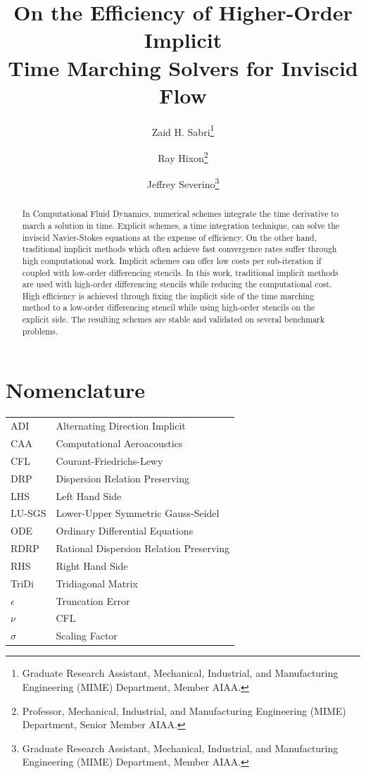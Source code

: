 \documentclass[conf]{new-aiaa}
\title{On the Efficiency of Higher-Order Implicit \\ Time Marching Solvers for Inviscid Flow
}
\author{Zaid H. Sabri\footnote{Graduate Research Assistant, Mechanical, Industrial, and Manufacturing Engineering (MIME) Department, Member AIAA.}}
\author{Ray Hixon\footnote{Professor, Mechanical, Industrial, and Manufacturing Engineering (MIME) Department, Senior Member AIAA.}}
\author{Jeffrey Severino\footnote{Graduate Research Assistant, Mechanical, Industrial, and Manufacturing Engineering (MIME) Department, Member AIAA.}}
\affil{University of Toledo, Toledo, OH, 43606}
\begin{document}
\maketitle

\begin{abstract}

In Computational Fluid Dynamics, numerical schemes integrate the time derivative to march a solution in time. 
Explicit schemes, a time integration technique, can solve the inviscid Navier-Stokes equations at the expense of efficiency.
On the other hand, traditional implicit methods which often achieve fast convergence rates suffer through high computational work. 
Implicit schemes can offer low costs per sub-iteration if coupled with low-order differencing stencils. 
In this work, traditional implicit methods are used with high-order differencing stencils while reducing the computational cost. 
High efficiency is achieved through fixing the implicit side of the time marching method to a low-order differencing stencil while using high-order stencils on the explicit side. 
The resulting schemes are stable and validated on several benchmark problems.

\end{abstract}

\section{Nomenclature}

{\renewcommand\arraystretch{1.0}
\noindent\begin{longtable*}{@{}l @{\quad=\quad} l@{}}
ADI & Alternating Direction Implicit \\
CAA  & Computational Aeroacoustics \\
CFL &    Courant-Friedrichs-Lewy \\
DRP & Dispersion Relation Preserving \\
LHS & Left Hand Side \\ 
LU-SGS & Lower-Upper Symmetric Gauss-Seidel \\ 
ODE & Ordinary Differential Equations \\
RDRP & Rational Dispersion Relation Preserving \\
RHS & Right Hand Side \\
TriDi & Tridiagonal Matrix \\
$\epsilon$ & Truncation Error \\
$\nu$ & CFL \\
$\sigma$ & Scaling Factor

\end{longtable*}}
\end{document}
